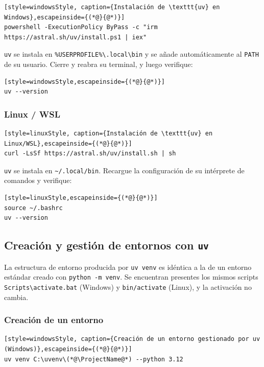 \begin{lstlisting}[style=windowsStyle, caption={Instalación de \texttt{uv} en Windows},escapeinside={(*@}{@*)}]
powershell -ExecutionPolicy ByPass -c "irm https://astral.sh/uv/install.ps1 | iex"
\end{lstlisting}

\texttt{uv} se instala en
\texttt{\%USERPROFILE\%\textbackslash.local\textbackslash bin} y se añade
automáticamente al \texttt{PATH} de su usuario. Cierre y reabra su terminal,
y luego verifique:

\begin{lstlisting}[style=windowsStyle,escapeinside={(*@}{@*)}]
uv --version
\end{lstlisting}

\subsubsection{Linux / WSL}

\begin{lstlisting}[style=linuxStyle, caption={Instalación de \texttt{uv} en Linux/WSL},escapeinside={(*@}{@*)}]
curl -LsSf https://astral.sh/uv/install.sh | sh
\end{lstlisting}

\texttt{uv} se instala en \texttt{\textasciitilde/.local/bin}. Recargue la
configuración de su intérprete de comandos y verifique:

\begin{lstlisting}[style=linuxStyle,escapeinside={(*@}{@*)}]
source ~/.bashrc
uv --version
\end{lstlisting}

\subsection{Creación y gestión de entornos con \texttt{uv}}

La estructura de entorno producida por \texttt{uv venv} es idéntica a la de
un entorno estándar creado con \texttt{python -m venv}. Se encuentran
presentes los mismos scripts \texttt{Scripts\textbackslash activate.bat}
(Windows) y \texttt{bin/activate} (Linux), y la activación no cambia.

\subsubsection{Creación de un entorno}

\begin{lstlisting}[style=windowsStyle, caption={Creación de un entorno gestionado por uv (Windows)},escapeinside={(*@}{@*)}]
uv venv C:\uvenv\(*@\ProjectName@*) --python 3.12
\end{lstlisting}

